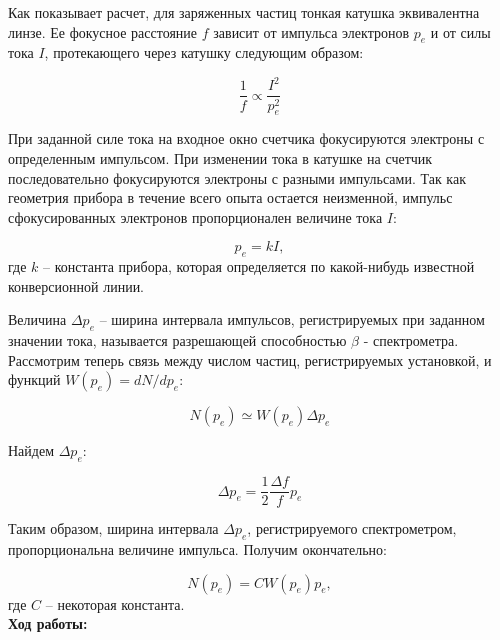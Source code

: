 \documentclass[a4paper, 12pt]{article}%
\begin{document}
	Как показывает расчет,  для заряженных частиц тонкая катушка эквивалентна линзе.  Ее фокусное расстояние $f$ зависит от импульса электронов $p_e$ и от силы тока $I$,  протекающего через катушку следующим образом:

\[\frac{1}{f} \propto \frac{I^2}{p_e^2}\]

	При заданной силе тока на входное окно счетчика фокусируются электроны с определенным импульсом.  При изменении тока в катушке на счетчик последовательно фокусируются электроны с разными импульсами.  Так как геометрия прибора в течение всего опыта остается неизменной, импульс сфокусированных электронов пропорционален величине тока $I$:

\[p_e = kI,  \]
где $k$ -- константа прибора,  которая определяется по какой-нибудь известной конверсионной линии.

Величина $\Delta p_e$ -- ширина интервала импульсов,  регистрируемых при заданном значении тока,  называется разрешающей способностью $\beta$ - спектрометра.  Рассмотрим теперь связь между числом частиц,  регистрируемых установкой,  и функций $W(p_e) = dN/dp_e$:

\[N(p_e) \simeq W(p_e) \Delta p_e\]

Найдем $\Delta p_e$:

\[\Delta p_e = \dfrac{1}{2} \dfrac{\Delta f}{f} p_e\]

Таким образом,  ширина интервала $\Delta p_e$,  регистрируемого спектрометром,  пропорциональна величине импульса.  Получим окончательно:

\[N(p_e) = CW(p_e)p_e, \]
где $C$ -- некоторая константа.\\

\textbf{Ход работы:}\\\par
\end{document}
